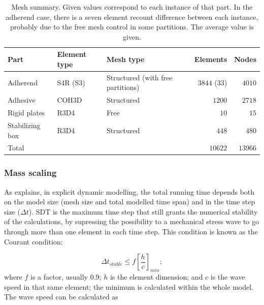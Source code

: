 \documentclass[cmfonts]{witpress}
\begin{document}
\begin{table}
	\centering
	\begin{tabular}{ll p{3cm} rr}

		\toprule

		Part & Element type & Mesh type & Elements & Nodes \\

		\midrule

		Adherend & S4R (S3) & Structured (with free partitions) & $3844$ ($33$) & $4010$ \\
		Adhesive & COH3D & Structured & $1200$ & $2718$ \\
		Rigid plates & R3D4 & Free & $10$ & $15$ \\
		Stabilizing box & R3D4 & Structured & $448$ & $480$ \\

		\midrule

		Total &&& $10622$ & $13966$ \\

		\bottomrule

	\end{tabular}
	\caption[Mesh summary.]{Mesh summary. Given values correspond to each instance of that part. In the adherend case, there is a seven element recount difference between each instance, probably due to the free mesh control in some partitions. The average value is given.}
	\label{tab:mesh}
\end{table}

\subsubsection{Mass scaling}
\label{sec:mass_scaling}

As \cite{Hale} explains, in explicit dynamic modelling, the total running time depends both on the model size (mesh size and total modelled time span) and in the time step size (${\Delta}t$). \Acrfull{SDT} is the maximum time step that still grants the numerical stability of the calculations, by supressing the possibility to a mechanical stress wave to go through more than one element in each time step. This condition is known as the Courant condition:

\begin{equation}
{\Delta}t_{stable} \leq f \left[\frac{h}{c}\right]_{min} ;
\label{eq:courant}
\end{equation}
where $f$ is a factor, usually $0.9$; $h$ is the element dimension; and $c$ is the wave speed in that same element; the minimum is calculated within the whole model. The wave speed can be calculated as
\end{document}

